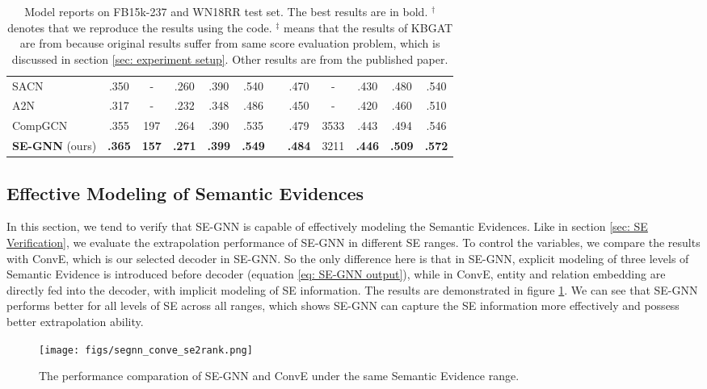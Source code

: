 \documentclass[letterpaper]{article} \usepackage{aaai22}  \usepackage{times}  \usepackage{helvet}  \usepackage{courier}  \usepackage[hyphens]{url}  \usepackage{graphicx} \urlstyle{rm} \def\UrlFont{\rm}  \usepackage{natbib}  \usepackage{caption} \DeclareCaptionStyle{ruled}{labelfont=normalfont,labelsep=colon,strut=off} \frenchspacing  \setlength{\pdfpagewidth}{8.5in}  \setlength{\pdfpageheight}{11in}  \usepackage{algorithm}
\begin{document}
\begin{table*}
\begin{tabular}{lccccccccccc}
      SACN \cite{AAAI_2019_Shang_SACN}         & .350 & -   & .260 & .390 & .540 & & .470 & -    & .430 & .480 & .540\\
      A2N \cite{ACL_2019_Bansal_A2N}         & .317 & -   & .232 & .348 & .486 &  & .450 & -    & .420 & .460 & .510\\
      CompGCN\cite{ICLR_2020_Vashishth_CompGCN}       & .355 & 197 & .264 & .390 & .535 & & .479 & 3533 & .443 & .494 & .546 \\
      \hline
        \textbf{SE-GNN} (ours)        & \textbf{.365} & \textbf{157} & \textbf{.271} & \textbf{.399} & \textbf{.549} & & \textbf{.484} & 3211 & \textbf{.446} & \textbf{.509} & \textbf{.572}\\
      \bottomrule
    \end{tabular}
    \caption{
    Model reports on FB15k-237 and WN18RR test set. The best results are in bold. $^{\dagger}$ denotes that we reproduce the results using the code\footnotemark. $^{\ddagger}$ means that the results of KBGAT are from \cite{ACL_2020_Sun_re-eval} because original results suffer from same score evaluation problem, which is discussed in section \ref{sec: experiment setup}. 
    Other results are from the published paper.
    }
    \label{tab: kgc result}
\end{table*}

\subsection{Effective Modeling of Semantic Evidences}

In this section, we tend to verify that SE-GNN is capable of effectively modeling the Semantic Evidences. Like in section \ref{sec: SE Verification}, we evaluate the extrapolation performance of SE-GNN in different SE ranges. To control the variables, we compare the results with ConvE, which is our selected decoder in SE-GNN. So the only difference here is that in SE-GNN, explicit modeling of three levels of Semantic Evidence is introduced before decoder (equation \ref{eq: SE-GNN output}), while in ConvE, entity and relation embedding are directly fed into the decoder, 
with implicit modeling of SE information. 
The results are demonstrated in figure \ref{fig: segnn_conve_se2rank}. We can see that SE-GNN performs better for all levels of SE across all ranges, which shows SE-GNN can capture the SE information more effectively and possess better extrapolation ability.

\begin{figure}[t]
    \centering
    \texttt{[image: figs/segnn\_conve\_se2rank.png]}
    \caption{The performance comparation of SE-GNN and ConvE under the same Semantic Evidence range.}
    \label{fig: segnn_conve_se2rank}
\end{figure}
\end{document}
